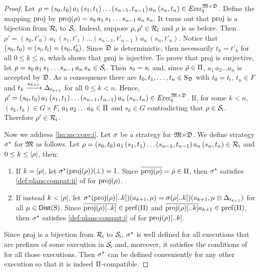 \begin{proof}
  Let
  $\rho=(s_0,t_0)\, a_1\, (s_1,t_1)\ldots (s_{n-1},t_{n-1})\, a_n\, (s_n,t_n) \in\mathit{Exec}_{\mathsf{f}}^{{\mathfrak{M}}{\times}{\mathfrak{D}}}$.
  Define the mapping $\mathrm{proj}$ by
  $\mathrm{proj}(\rho)=s_0\, a_1\, s_1\ldots s_{n-1}\, a_n\, s_n$.
  It turns out that $\mathrm{proj}$ is a bijection from
  $\mathcal{R}_{\mathsf{i}}$ to $\mathcal{S}_{\mathsf{i}}$.
  Indeed, suppose $\rho,\rho'\in\mathcal{R}_{\textsf{i}}$ and $\rho$
  is as before. Then
  $\rho'=(s_0,t'_0)\, a_1\, (s_1,t'_1)\ldots (s_{n-1},t'_{n-1})\, a_n\, (s_n,t'_n)$.
  Notice that $(s_0,t_0)=({s_{\textsf{i}}},{t_{\textsf{i}}})=(s_0,t'_0)$.  Since ${\mathfrak{D}}$ is
  deterministic, then necessarily $t_k=t'_k$ for all $0\leq k\leq n$,
  which shows that $\mathrm{proj}$ is injective.
  To prove that $\mathrm{proj}$ is surjective, let
  $\rho=s_0\, a_1\, s_1\ldots s_{n-1}\, a_n\, s_n\in\mathcal{S}_{\textsf{i}}$.
  Then $s_0={s_{\textsf{i}}}$ and, since $\bar{\rho}\in\Pi$,
  $a_1\, a_2\ldots a_n$ is accepted by ${\mathfrak{D}}$.
  As a consequence there are $t_0,t_1,\ldots,t_n\in\operatorname{S}_{\mathfrak{D}}$ with
  $t_0={t_{\textsf{i}}}$, $t_n\in F$ and $t_k\xrightarrow{a_{k+1}}\Delta_{t_{k+1}}$ for
  all $0\leq k<n$.
  Hence,
  $\rho'=(s_0,t_0)\, a_1\, (s_1,t_1)\ldots (s_{n-1},t_{n-1})\, a_n\, (s_n,t_n)\in\mathit{Exec}_{\mathsf{f}}^{{\mathfrak{M}}{\times}{\mathfrak{D}}}$.
  If, for some $k<n$, $(s_k,t_k)\in{G{\times}F}$,
  $a_1\, a_2\ldots a_k\in\Pi$ and $s_k\in G$ contradicting that
  $\rho\in\mathcal{S}_{\mathsf{i}}$.
  Therefore $\rho'\in\mathcal{R}_{\mathsf{i}}$.

  Now we address \cref{lm:mc:core:i}.  Let $\sigma$ be a strategy for
  ${\mathfrak{M}}{\times}{\mathfrak{D}}$.  We define strategy $\sigma^\star$ for
  ${\mathfrak{M}}$ as follows.
  Let
  $\rho=(s_0,t_0)\, a_1\, (s_1,t_1)\ldots (s_{n-1},t_{n-1})\, a_n\, (s_n,t_n)\in\mathcal{R}_{\mathsf{i}}$
  and $0\leq k\leq{|}{\rho}{|}$, then:
  \begin{enumerate}
  \item%
    If $k={|}{\rho}{|}$, let $\sigma^\star(\mathrm{proj}(\rho))(\bot)=1$.
    Since $\overline{\mathrm{proj}(\rho)}=\bar{\rho}\in\Pi$, then
    $\sigma^\star$ satisfies \cref{def:plans:compat:ii} of
     for $\mathrm{proj}(\rho)$.
  \item%
    If instead $k<{|}{\rho}{|}$, let
    $\sigma^\star(\mathrm{proj}(\rho)[..k])(a_{k+1},\mu)=\sigma(\rho[..k])(a_{k+1},\mu\otimes\Delta_{t_{k+1}})$
    for all $\mu\in\mathsf{Dist}(\operatorname{S})$.
    Since $\overline{\mathrm{proj}(\rho)[..k]}\in\mathrm{pref}(\Pi)$ and
    $\overline{\mathrm{proj}(\rho)[..k]}a_{k+1}\in\mathrm{pref}(\Pi)$, then
    $\sigma^\star$ satisfies \cref{def:plans:compat:i} of
     for $\mathrm{proj}(\rho)[..k]$.
  \end{enumerate}
  Since $\mathrm{proj}$ is a bijection from $\mathcal{R}_{\mathsf{i}}$ to $\mathcal{S}_{\mathsf{i}}$, 
  $\sigma^\star$ is well defined for all executions that are prefixes of
  some execution in $\mathcal{S}_{\mathsf{i}}$ and, moreover, it satisfies the
  conditions of  for all those executions.
  Then $\sigma^\star$ can be defined conveniently for any other
  execution so that it is indeed $\Pi$-compatible.


\end{proof}
